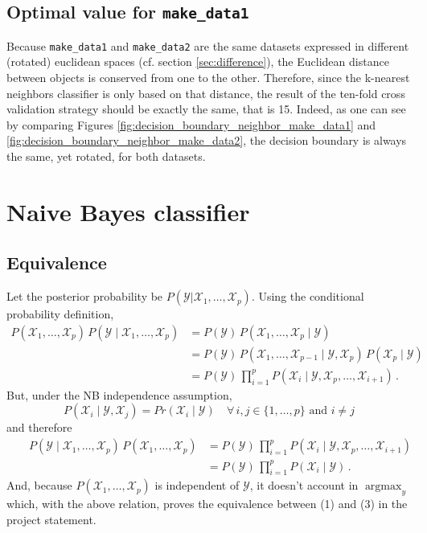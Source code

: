 \documentclass[a4paper, 12pt]{article}
\newcommand{\X}{\mathcal{X}}
\newcommand{\Y}{\mathcal{Y}}
\DeclareMathOperator{\argmax}{argmax}
\begin{document}
    \subsection{Optimal value for \texttt{make\_data1}}
    Because \texttt{make\_data1} and \texttt{make\_data2} are the same datasets expressed in different (rotated) euclidean spaces (cf. section \ref{sec:difference}), the Euclidean distance between objects is conserved from one to the other. Therefore, since the k-nearest neighbors classifier is only based on that distance, the result of the ten-fold cross validation strategy should be exactly the same, that is 15. Indeed, as one can see by comparing Figures \ref{fig:decision_boundary_neighbor_make_data1} and \ref{fig:decision_boundary_neighbor_make_data2}, the decision boundary is always the same, yet rotated, for both datasets.
    
    \section{Naive Bayes classifier}
    \subsection{Equivalence}
    Let the posterior probability be $P(\Y | \X_1, \ldots, \X_p)$. Using the conditional probability definition,
    \begin{align*}
        P(\X_1, \ldots, \X_p) \, P(\Y \mid \X_1, \ldots, \X_p) & = P(\Y) \, P(\X_1, \ldots, \X_p \mid \Y) \\
        & = P(\Y) \, P(\X_1, \ldots, \X_{p - 1} \mid \Y, \X_p) \, P(\X_p \mid \Y) \\
        & = P(\Y) \, \prod_{i = 1}^{p} P(\X_i \mid \Y, \X_p, \ldots, \X_{i + 1}) \,.
    \end{align*}
    But, under the NB independence assumption,
    \begin{equation*}
        P(\X_i \mid \Y, \X_j) = Pr(\X_i \mid \Y) \quad \forall \, i, j \in \{1, \ldots, p\} \text{ and } i \neq j
    \end{equation*}
    and therefore
    \begin{align*}
        && P(\Y \mid \X_1, \ldots, \X_p) \, P(\X_1, \ldots, \X_p) & = P(\Y) \, \prod_{i = 1}^{p} P(\X_i \mid \Y, \X_p, \ldots, \X_{i + 1}) \\
        && & = P(\Y) \, \prod_{i = 1}^{p} P(\X_i \mid \Y) \, .
    \end{align*}
    And, because $P(\X_1, \ldots, \X_p)$ is independent of $\Y$, it doesn't account in \og{}$\argmax_y$\fg{} which, with the above relation, proves the equivalence between (1) and (3) in the project statement.
    
\end{document}
